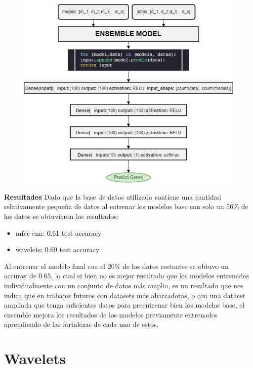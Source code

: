 \documentclass[colorinlistoftodos,twoside,twocolumn,10pt]{article} %
\begin{document}
\begin{figure}
\includegraphics{ensemble.png}
\end{figure}
\textbf{\large Resultados}
Dado que la base de datos utilizada contiene una cantidad relativamente peque\~na de datos al entrenar los modelos base con solo un 56\% de los datos se obtuvieron los resultados: 

\begin{itemize}
\item mfcc-cnn: 0.61 test accuracy
\item wavelets: 0.60 test accuracy 
\end{itemize}

Al entrenar el modelo final con el 20\% de los datos restantes se obtuvo un accuray de 0.65, lo cual si bien no es mejor resultado que los modelos entrenados individualmente con un conjunto de datos m\'as amplio, es un resultado que nos indica que en trabajos futuros con datasets m\'as abarcadoras, o con una dataset ampliada que tenga suficientes datos para preentrenar bien los modelos base, el ensemble mejora los resultados de los modelos previamente entrenados aprendiendo de las fortalezas de cada uno de estos.

	\section{Wavelets}
\end{document}
